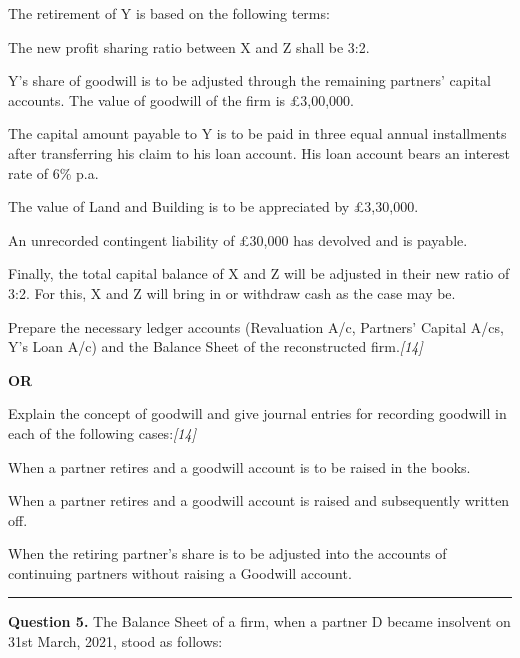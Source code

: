 \documentclass[11pt,a4paper]{article}
\newcommand{\pts}[1]{\hfill   \textit{[#1]}}
\begin{document}
\noindent The retirement of Y is based on the following terms:

\begin{parts}
  \item The new profit sharing ratio between X and Z shall be 3:2.
  \item Y's share of goodwill is to be adjusted through the remaining partners' capital accounts. The value of goodwill of the firm is \pounds 3,00,000.
  \item The capital amount payable to Y is to be paid in three equal annual installments after transferring his claim to his loan account. His loan account bears an interest rate of 6\% p.a.
  \item The value of Land and Building is to be appreciated by \pounds 3,30,000.
  \item An unrecorded contingent liability of \pounds 30,000 has devolved and is payable.
  \item Finally, the total capital balance of X and Z will be adjusted in their new ratio of 3:2. For this, X and Z will bring in or withdraw cash as the case may be.
\end{parts}
Prepare the necessary ledger accounts (Revaluation A/c, Partners' Capital A/cs, Y's Loan A/c) and the Balance Sheet of the reconstructed firm.\pts{14}

\centerline{   \textbf{OR}}

Explain the concept of goodwill and give journal entries for recording goodwill in each of the following cases:\pts{14}

\begin{parts}
  \item When a partner retires and a goodwill account is to be raised in the books.
  \item When a partner retires and a goodwill account is raised and subsequently written off.
  \item When the retiring partner's share is to be adjusted into the accounts of continuing partners without raising a Goodwill account.
\end{parts}

\medskip\rule{\linewidth}{0.2pt}


\newpage




\noindent   \textbf{Question 5.}
The Balance Sheet of a firm, when a partner D became insolvent on 31st March, 2021, stood as follows:
\end{document}
